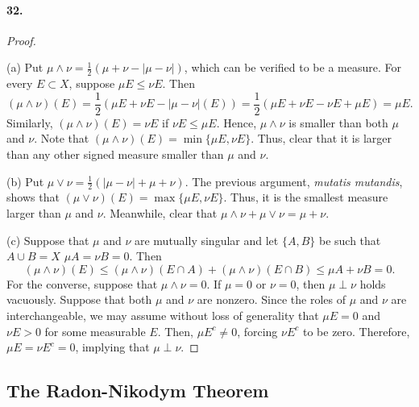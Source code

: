   \paragraph{32.}
  \begin{proof}
    $\,$\par
    (a) Put $\mu\wedge\nu=\frac{1}{2}(\mu+\nu-|\mu-\nu|)$, which can be 
    verified to be a measure. For every $E\subset X$, suppose $\mu E\le\nu E$. 
    Then
    \[
      (\mu\wedge\nu)(E)=
      \frac{1}{2}(\mu E+\nu E-|\mu-\nu|(E))=
      \frac{1}{2}(\mu E+\nu E-\nu E+\mu E)=
      \mu E.
    \]
    Similarly, $(\mu\wedge\nu)(E)=\nu E$ if $\nu E\le\mu E$. Hence, $\mu
    \wedge\nu$ is smaller than both $\mu$ and $\nu$. Note that $(\mu\wedge\nu)
    (E)=\min\{\mu E, \nu E\}$. Thus, clear that it is larger than any other
    signed measure smaller than $\mu$ and $\nu$.\par
    (b) Put $\mu\vee\nu=\frac{1}{2}(|\mu-\nu|+\mu+\nu)$. The previous argument,
    \textit{mutatis mutandis}, shows that $(\mu\vee\nu)(E)=\max\{\mu E,\nu E
    \}$. Thus, it is the smallest measure larger than $\mu$ and $\nu$. 
    Meanwhile, clear that $\mu\wedge\nu+\mu\vee\nu=\mu+\nu$.\par
    (c) Suppose that $\mu$ and $\nu$ are mutually singular and let $\{A,B\}$
    be such that $A\cup B=X$ $\mu A=\nu B=0$. Then
    \[
      (\mu\wedge\nu)(E)\le(\mu\wedge\nu)(E\cap A)+(\mu\wedge\nu)(E\cap B)
      \le\mu A+\nu B=0.
    \]
    For the converse, suppose that $\mu\wedge\nu=0$. If $\mu=0$ or $\nu=0$, 
    then $\mu\perp\nu$ holds vacuously. Suppose that both $\mu$ and $\nu$ are
    nonzero. Since the roles of $\mu$ and $\nu$ are interchangeable, we may
    assume without loss of generality that $\mu E=0$ and $\nu E>0$ for some
    measurable $E$. Then, $\mu E^c\ne 0$, forcing $\nu E^c$ to be zero. 
    Therefore, $\mu E=\nu E^c=0$, implying that $\mu\perp\nu$.
  \end{proof}
\subsection{The Radon-Nikodym Theorem}
